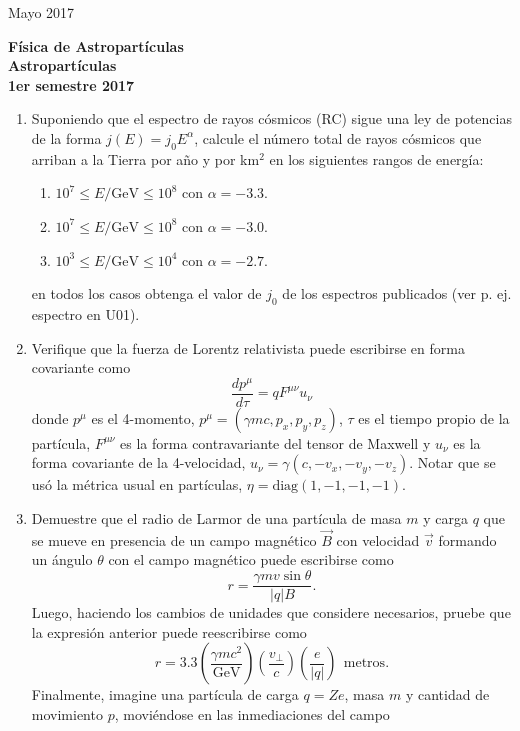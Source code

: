 \documentclass[11pt]{article}
\begin{document}
\pagestyle{empty}
{Mayo 2017}
\begin{center}
	{\Large \bf Física de Astropartículas} \\
{ \large \bf Astropartículas} \\ {\bf 1er semestre 2017}
\end{center}

\setcounter{enumi}{0}      %
\begin{enumerate}
	\item Suponiendo que el espectro de rayos cósmicos (RC) sigue una ley de
		potencias de la forma $j(E)=j_0 E^{\alpha}$, calcule el número total de
		rayos cósmicos que arriban a la Tierra por año y por km$^2$ en los
		siguientes rangos de energía:
		\begin{enumerate}
			\item $10^{7} \leq E/\mathrm{GeV} \leq 10^{8}$ con $\alpha=-3.3$.
			\item $10^{7} \leq E/\mathrm{GeV} \leq 10^{8}$ con $\alpha=-3.0$.
			\item $10^{3} \leq E/\mathrm{GeV} \leq 10^{4}$ con $\alpha=-2.7$.
		\end{enumerate}
		en todos los casos obtenga el valor de $j_0$ de los espectros
		publicados (ver p. ej. espectro en U01).
	\item Verifique que la fuerza de Lorentz relativista puede escribirse en
		forma covariante como $$ \frac{dp^\mu}{d\tau} = q F^{\mu\nu} u_\nu$$
		donde $p^\mu$ es el 4-momento, $p^\mu = (\gamma m c, p_x, p_y, p_z)$,
		$\tau$ es el tiempo propio de la partícula, $F^{\mu\nu}$ es la forma
		contravariante del tensor de Maxwell y $u_\nu$ es la forma covariante
		de la 4-velocidad, $u_\nu= \gamma (c, -v_x, -v_y, -v_z)$. Notar que se
		usó la métrica usual en partículas, $\eta=\mathrm{diag}(1,-1,-1,-1)$.
	\item Demuestre que el radio de Larmor de una partícula de masa $m$ y
		carga $q$ que se mueve en presencia de un campo magnético $\vec B$ con
		velocidad $\vec v$ formando un ángulo $\theta$ con el campo magnético
		puede escribirse como $$ r= \frac{\gamma m v \sin \theta}{|q|
		B}.$$Luego, haciendo los cambios de unidades que considere necesarios,
		pruebe que la expresión anterior puede reescribirse como $$r = 3.3 
			\left ( \frac{\gamma m c^2}{\mathrm{GeV}} \right )
			\left ( \frac{v_\perp}{c} \right )
			\left ( \frac{e}{|q|} \right )
			\mathrm{\ \ metros}.
		$$ Finalmente, imagine una partícula de carga $q=Ze$, masa $m$ y
		cantidad de movimiento $p$, moviéndose en las inmediaciones del campo

\end{enumerate}
\end{document}
